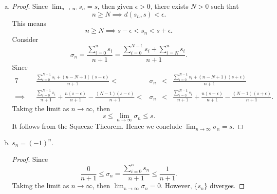 \begin{Exercise}
	\begin{enumerate}[(a)]
		\item
		\begin{proof}
			Since $\lim_{n\to\infty} s_n = s$, then given $\epsilon>0$, there exists $N>0$ such that
			$$
			n\geq N \implies d(s_n,s) < \epsilon.
			$$
			This means
			$$
			n\geq N \implies s-\epsilon < s_n < s+\epsilon.
			$$
			Consider
			$$
			\sigma_n = \frac{\sum_{i=0}^{n} s_i}{n+1} = \frac{\sum_{i=0}^{N-1} s_i + \sum_{i=N}^{n} s_i}{n+1}.
			$$
			Since
			\begin{alignat*}{7}
			\quad&& \frac{\sum_{i=0}^{N-1}s_i + (n-N+1)(s-\epsilon)}{n+1} <& \sigma_n &<& \frac{\sum_{i=0}^{N-1}s_i + (n-N+1)(s+\epsilon)}{n+1} \\
			\implies&& \frac{\sum_{i=0}^{N-1}s_i}{n+1}+\frac{n(s-\epsilon)}{n+1}-\frac{(N-1)(s-\epsilon)}{n+1} <& \sigma_n &<& \frac{\sum_{i=0}^{N-1}s_i}{n+1}+\frac{n(s-\epsilon)}{n+1}-\frac{(N-1)(s+\epsilon)}{n+1}.
			\end{alignat*}
			Taking the limit as $n\to\infty$, then
			$$
			s \leq \lim_{n\to\infty} \sigma_n \leq s.
			$$
			It follows from the Squeeze Theorem. 
			Hence we conclude $\lim_{n\to\infty} \sigma_n = s$.
		\end{proof}
		
		\item
		\begin{answer}
			$s_n = (-1)^n$.
		\end{answer}
		\begin{proof}
			Since 
			$$
			\frac{0}{n+1} \leq \sigma_n = \frac{\sum_{i=0}^{n} s_n}{n+1} \leq \frac{1}{n+1}.
			$$
			Taking the limit as $n\to\infty$, then $\lim_{n\to\infty} \sigma_n = 0$. 
			However, $\{s_n\}$ diverges.
		\end{proof}
		

\end{enumerate}
\end{Exercise}
